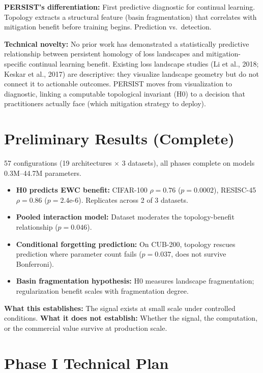 \documentclass[11pt,letterpaper]{article}
\begin{document}
\textbf{PERSIST's differentiation:} First predictive diagnostic for continual learning. Topology extracts a structural feature (basin fragmentation) that correlates with mitigation benefit before training begins. Prediction vs.\ detection.

\textbf{Technical novelty:} No prior work has demonstrated a statistically predictive relationship between persistent homology of loss landscapes and mitigation-specific continual learning benefit. Existing loss landscape studies (Li et al., 2018; Keskar et al., 2017) are descriptive: they visualize landscape geometry but do not connect it to actionable outcomes. PERSIST moves from visualization to diagnostic, linking a computable topological invariant (H0) to a decision that practitioners actually face (which mitigation strategy to deploy).

\section{Preliminary Results (Complete)}

57 configurations (19 architectures $\times$ 3 datasets), all phases complete on models 0.3M--44.7M parameters.

\begin{itemize}[nosep]
  \item \textbf{H0 predicts EWC benefit:} CIFAR-100 $\rho = 0.76$ ($p = 0.0002$), RESISC-45 $\rho = 0.86$ ($p = 2.4\text{e-}6$). Replicates across 2 of 3 datasets.
  \item \textbf{Pooled interaction model:} Dataset moderates the topology-benefit relationship ($p = 0.046$).
  \item \textbf{Conditional forgetting prediction:} On CUB-200, topology rescues prediction where parameter count fails ($p = 0.037$, does not survive Bonferroni).
  \item \textbf{Basin fragmentation hypothesis:} H0 measures landscape fragmentation; regularization benefit scales with fragmentation degree.
\end{itemize}

\textbf{What this establishes:} The signal exists at small scale under controlled conditions. \textbf{What it does not establish:} Whether the signal, the computation, or the commercial value survive at production scale.

\section{Phase I Technical Plan}
\end{document}
